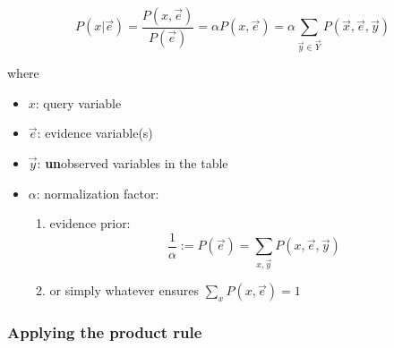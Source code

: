 \begin{frame}\frametitle{\subsubsecname}

\begin{equation}
P(x | \vec e)
= \frac{P(x, \vec e)}{P(\vec e)}
= \alpha P(x, \vec e)
= \alpha \sum_{\vec y \in \vec Y} P(\vec x, \vec e, \vec y)
\end{equation}

where
\begin{itemize}
\item[] $x$: query variable
\item[] $\vec e$: evidence variable(s)
\item[] $\vec y$: \textbf{un}observed variables in the table
\item[] $\alpha$: normalization factor:


\pause

\begin{enumerate}
\item evidence prior:
\begin{equation}
\frac{1}{\alpha} := P(\vec e) = \sum_{x, \vec y} P(x, \vec e, \vec y)  
\end{equation}
\item or simply whatever ensures $\sum_{ x} P(x, \vec e) = 1$
\end{enumerate}

\end{itemize}
    
\end{frame}

\subsubsection{Applying the product rule}

